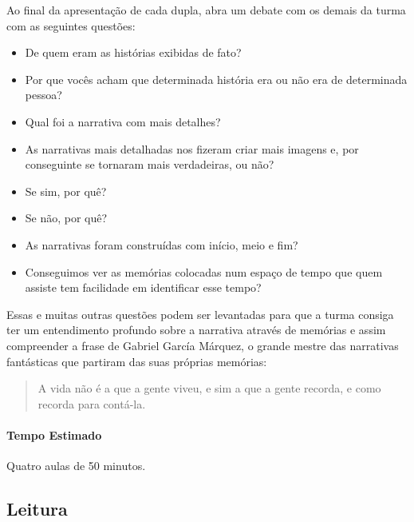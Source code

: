 \documentclass[11pt]{extarticle}
\begin{document}

Ao final da apresentação de cada dupla, abra um debate com os demais da turma com as seguintes questões:

\begin{itemize}
\item De quem eram as histórias exibidas de fato?
\item Por que vocês acham que determinada história era ou não era de determinada pessoa?
\item Qual foi a narrativa com mais detalhes?
\item As narrativas mais detalhadas nos fizeram criar mais imagens e, por conseguinte se tornaram mais verdadeiras, ou não?
\item Se sim, por quê? 
\item Se não, por quê?
\item As narrativas foram construídas com início, meio e fim?
\item Conseguimos ver as memórias colocadas num espaço de tempo que quem assiste tem facilidade em identificar esse tempo?
\end{itemize}

Essas e muitas outras questões podem ser levantadas para que a turma consiga ter um entendimento profundo sobre a narrativa através de memórias e assim compreender a frase de Gabriel García Márquez, o grande mestre das narrativas fantásticas que partiram das suas próprias memórias:

\begin{quote}

A vida não é a que a gente viveu, e sim a que a gente recorda, e como recorda para contá-la. 

\end{quote}

\paragraph{Tempo Estimado} Quatro aulas de 50 minutos. 

\subsection{Leitura}

\end{document}
